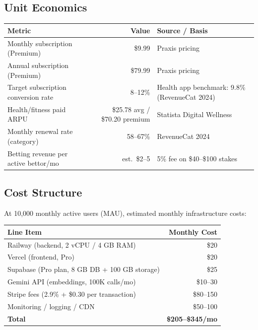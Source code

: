 \documentclass[11pt,a4paper]{article}
\begin{document}
\subsection{Unit Economics}

\begin{center}
\begin{tabular}{lrl}
\toprule
\textbf{Metric} & \textbf{Value} & \textbf{Source / Basis} \\
\midrule
Monthly subscription (Premium) & \$9.99 & Praxis pricing \\
Annual subscription (Premium) & \$79.99 & Praxis pricing \\
Target subscription conversion rate & 8--12\% & Health app benchmark: 9.8\% {\small (RevenueCat 2024)} \\
Health/fitness paid ARPU & \$25.78 avg / \$70.20 premium & Statista Digital Wellness \\
Monthly renewal rate (category) & 58--67\% & RevenueCat 2024 \\
Betting revenue per active bettor/mo & est.\ \$2--5 & 5\% fee on \$40--\$100 stakes \\
\bottomrule
\end{tabular}
\end{center}

\subsection{Cost Structure}

At 10,000 monthly active users (MAU), estimated monthly infrastructure costs:

\begin{center}
\begin{tabular}{lr}
\toprule
\textbf{Line Item} & \textbf{Monthly Cost} \\
\midrule
Railway (backend, 2 vCPU / 4 GB RAM) & \$20 \\
Vercel (frontend, Pro) & \$20 \\
Supabase (Pro plan, 8 GB DB + 100 GB storage) & \$25 \\
Gemini API (embeddings, 100K calls/mo) & \$10--30 \\
Stripe fees (2.9\% + \$0.30 per transaction) & \$80--150 \\
Monitoring / logging / CDN & \$50--100 \\
\midrule
\textbf{Total} & \textbf{\$205--\$345/mo} \\
\bottomrule
\end{tabular}
\end{center}
\end{document}
